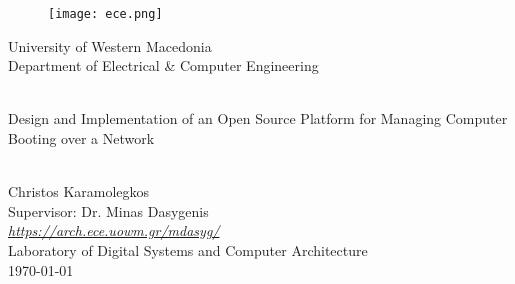 \begin{titlepage}
	\begin{center}
		\begin{figure}[h]
			\centering \texttt{[image: ece.png]}
		\end{figure}
		{\LARGE University of Western Macedonia\\}
		{\Large Department of Electrical \& Computer Engineering}
		
		\begin{center}
			\vspace{2cm}
			
			\HRule \\[0.4cm]
			{\huge Design and Implementation of an Open Source Platform for Managing Computer Booting over a Network\\}
			\HRule \\[0.4cm]
		\end{center}
		
		\vfill
		\begin{doublespacing}
			
			{\LARGE Christos Karamolegkos\\}
			{\Large Supervisor: Dr. Minas Dasygenis\\}
			{\Large \href{https://arch.ece.uowm.gr/mdasyg/}{\textit{https://arch.ece.uowm.gr/mdasyg/}}\\}
			{\Large Laboratory of Digital Systems and Computer Architecture\\}
			\vfill
			{\Large \today}
		\end{doublespacing}
	\end{center}
\end{titlepage}
\afterpage{\blankpage}








\newpage\tableofcontents

\listoffigures
\clearpage


